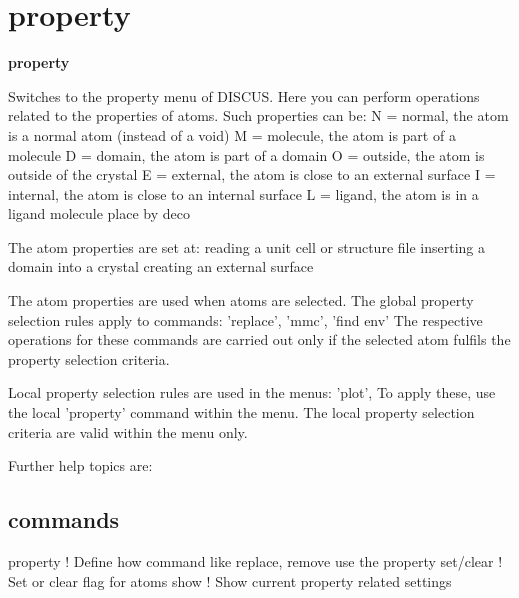\section{property}
{\bf property \par }
\par
\vspace{3pt}
Switches to the property menu of DISCUS. 
Here you can perform operations related to the properties of 
atoms. Such properties can be: 
N = normal,   the atom is a normal atom (instead of a void) 
M = molecule, the atom is part of a molecule 
D = domain,   the atom is part of a domain 
O = outside,  the atom is outside of the crystal 
E = external, the atom is close to an external surface 
I = internal, the atom is close to an internal surface 
L = ligand,   the atom is in a ligand molecule place by deco 
\par
The atom properties are set at: 
reading a unit cell or structure file 
inserting a domain into a crystal 
creating an external surface 
\par
The atom properties are used when atoms are selected. 
The global property selection rules apply to commands: 
    'replace', 'mmc', 'find env' 
    The respective operations for these commands are carried out only 
    if the selected atom fulfils the property selection criteria. 
\par
Local property selection rules are used in the menus: 
    'plot', 
    To apply these, use the local 'property' command within the menu. 
    The local property selection criteria are valid within the menu 
    only. 
\par
Further help topics are: 
\subsection*{commands}
\begin{MacVerbatim}
property  ! Define how command like replace, remove use the property
set/clear ! Set or clear flag for atoms
show      ! Show current property related settings
\end{MacVerbatim}
